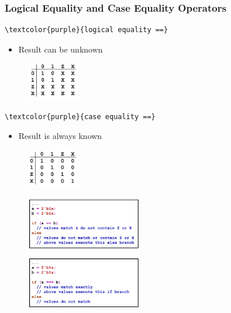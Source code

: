 \documentclass[t, notes, xcolor=table]{beamer}
\begin{document}
\begin{frame}[fragile]
\frametitle{Logical Equality and Case Equality Operators}
\scriptsize{
\begin{multicols}{2}

\begin{Verbatim}[commandchars=\\\{\}, tabsize=2]
\textcolor{purple}{logical equality ==}
\end{Verbatim}

\begin{itemize}
\item Result can be unknown
\end{itemize}

\begin{figure}
    \includegraphics[width=0.2\textwidth]{img/05_equal0.png}
\end{figure}
\begin{Verbatim}[commandchars=\\\{\}, tabsize=2]
\textcolor{purple}{case equality ==}
\end{Verbatim}
\begin{itemize}
\item Result is always known
\end{itemize}
\begin{figure}
    \includegraphics[width=0.2\textwidth]{img/05_equal1.png}
\end{figure}
\vfill
\columnbreak

\begin{figure}
    \includegraphics[width=0.45\textwidth]{img/05_equal2.png}
\end{figure}
\end{multicols}
}
\end{frame}
\end{document}
